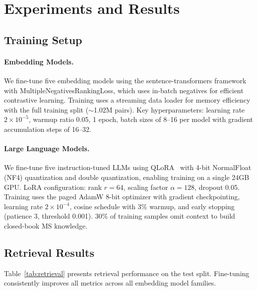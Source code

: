 \documentclass[11pt]{article}
\begin{document}
\section{Experiments and Results}
\label{sec:experiments}

\subsection{Training Setup}
\label{sec:training_setup}

\paragraph{Embedding Models.}
We fine-tune five embedding models using the sentence-transformers framework~\citep{reimers2019sentence} with MultipleNegativesRankingLoss, which uses in-batch negatives for efficient contrastive learning. Training uses a streaming data loader for memory efficiency with the full training split ($\sim$1.02M pairs). Key hyperparameters: learning rate $2 \times 10^{-5}$, warmup ratio 0.05, 1 epoch, batch sizes of 8--16 per model with gradient accumulation steps of 16--32.

\paragraph{Large Language Models.}
We fine-tune five instruction-tuned LLMs using QLoRA~\citep{dettmers2024qlora} with 4-bit NormalFloat (NF4) quantization and double quantization, enabling training on a single 24GB GPU. LoRA configuration: rank $r = 64$, scaling factor $\alpha = 128$, dropout 0.05. Training uses the paged AdamW 8-bit optimizer with gradient checkpointing, learning rate $2 \times 10^{-4}$, cosine schedule with 3\% warmup, and early stopping (patience 3, threshold 0.001). 30\% of training samples omit context to build closed-book MS knowledge.

\subsection{Retrieval Results}
\label{sec:retrieval_results}

Table~\ref{tab:retrieval} presents retrieval performance on the test split. Fine-tuning consistently improves all metrics across all embedding model families.
\end{document}
